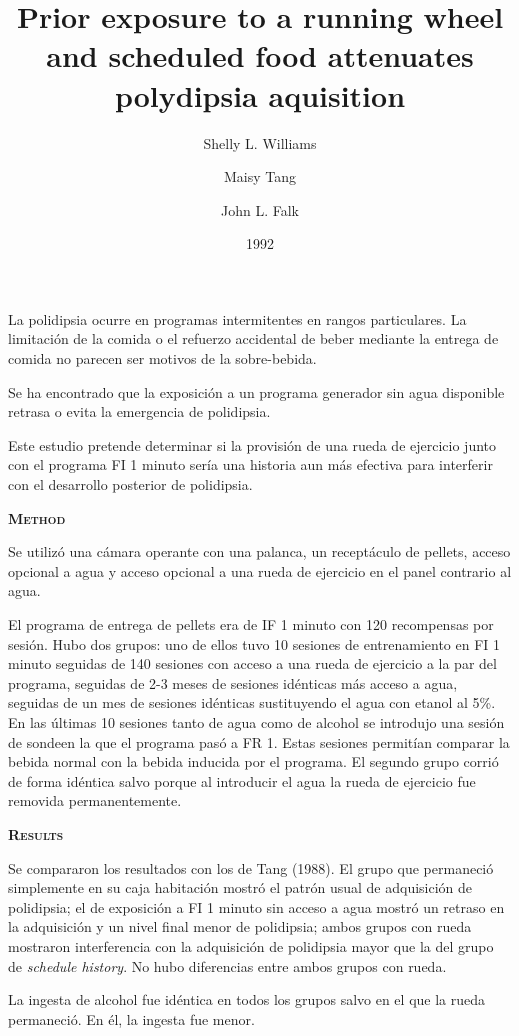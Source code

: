\documentclass[a4paper,12pt]{article}
\title{Prior exposure to a running wheel and scheduled food attenuates polydipsia aquisition}
\author{Shelly L. Williams \and Maisy Tang \and John L. Falk}
\date{1992}
\begin{document}
{\scshape\bfseries \maketitle}

La polidipsia ocurre en programas intermitentes en rangos particulares. La limitación de la comida o el refuerzo accidental de beber mediante la entrega de comida no parecen ser motivos de la sobre-bebida.

Se ha encontrado que la exposición a un programa generador sin agua disponible retrasa o evita la emergencia de polidipsia.

Este estudio pretende determinar si la provisión de una rueda de ejercicio junto con el programa FI 1 minuto sería una historia aun más efectiva para interferir con el desarrollo posterior de polidipsia.

{\scshape\bfseries Method}

Se utilizó una cámara operante con una palanca, un receptáculo de pellets, acceso opcional a agua y acceso opcional a una rueda de ejercicio en el panel contrario al agua.

El programa de entrega de pellets era de IF 1 minuto con 120 recompensas por sesión. Hubo dos grupos: uno de ellos tuvo 10 sesiones de entrenamiento en FI 1 minuto seguidas de 140 sesiones con acceso a una rueda de ejercicio a la par del programa, seguidas de 2-3 meses de sesiones idénticas más acceso a agua, seguidas de un mes de sesiones idénticas sustituyendo el agua con etanol al 5\%. En las últimas 10 sesiones tanto de agua como de alcohol se introdujo una sesión de sondeen la que el programa pasó a FR 1. Estas sesiones permitían comparar la bebida normal con la bebida inducida por el programa. El segundo grupo corrió de forma idéntica salvo porque al introducir el agua la rueda de ejercicio fue removida permanentemente.

{\scshape\bfseries Results}

Se compararon los resultados con los de Tang (1988). El grupo que permaneció simplemente en su caja habitación mostró el patrón usual de adquisición de polidipsia; el de exposición a FI 1 minuto sin acceso a agua mostró un retraso en la adquisición y un nivel final menor de polidipsia; ambos grupos con rueda mostraron interferencia con la adquisición de polidipsia mayor que la del grupo de {\itshape schedule history}. No hubo diferencias entre ambos grupos con rueda.

La ingesta de alcohol fue idéntica en todos los grupos salvo en el que la rueda permaneció. En él, la ingesta fue menor.
\end{document}

